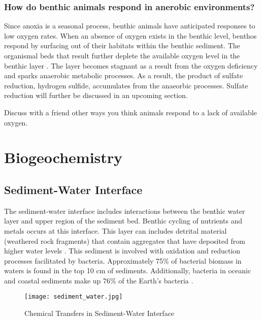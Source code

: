 \subsubsection{How do benthic animals respond in anerobic environments?}

Since anoxia is a seasonal process, benthic animals have anticipated responses to low oxygen rates. When an absence of oxygen exists in the benthic level, benthos respond by surfacing out of their habitats within the benthic sediment. The organismal beds that result further deplete the available oxygen level in the benthic layer \citep{jorgensen1980seasonal}. The layer becomes stagnant as a result from the oxygen deficiency and sparks anaerobic metabolic processes. As a result, the product of sulfate reduction, hydrogen sulfide, accumulates from the anaeorbic processes. Sulfate reduction will further be discussed in an upcoming section.

\begin{exercise}
Discuss with a friend other ways you think animals respond to a lack of available oxygen.
\end{exercise}

\section{Biogeochemistry}
\subsection{Sediment-Water Interface}

The sediment-water interface includes interactions between the benthic water layer and upper region of the sediment bed. Benthic cycling of nutrients and metals occurs at this interface. This layer can includes detrital material (weathered rock fragments) that contain aggregates that have deposited from higher water levels \citep{turley2000bacteria}. This sediment is involved with oxidation and reduction processes facilitated by bacteria.
Approximately 75\% of bacterial biomass in waters is found in the top 10 cm of sediments. Additionally, bacteria in oceanic and coastal sediments make up 76\% of the Earth's bacteria \citep{turley2000bacteria}. 

\begin{figure}[!h]
        \centering
        \texttt{[image: sediment\_water.jpg]}
        \caption{Chemical Transfers in Sediment-Water Interface}
        \label{fig:Sediment-Water Processes}
\end{figure}

